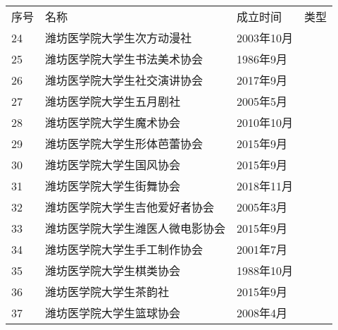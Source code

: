 \newpage
\begin{table}[H]
    \setlength{\leftskip}{0pt plus 1fil minus \marginparwidth}
    \setlength{\rightskip}{\leftskip}
    \vspace*{8em}
    \begin{tabular}{|>{\centering\arraybackslash}p{2em}|>{\centering\arraybackslash}p{21em}|%
        >{\centering\arraybackslash}p{6em}|>{\centering\arraybackslash}p{5em}|}
        \Xhline{1.2pt}
        序号 & 名称               & 成立时间     & 类型                      \\
        \Xhline{1.2pt}
        24 & 潍坊医学院大学生次方动漫社    & 2003年10月 & \multirow{29}{*}{文化体育类} \\
        \cline{1-3}
        25 & 潍坊医学院大学生书法美术协会   & 1986年9月  &                         \\
        \cline{1-3}
        26 & 潍坊医学院大学生社交演讲协会   & 2017年9月  &                         \\
        \cline{1-3}
        27 & 潍坊医学院大学生五月剧社     & 2005年5月  &                         \\
        \cline{1-3}
        28 & 潍坊医学院大学生魔术协会     & 2010年10月 &                         \\
        \cline{1-3}
        29 & 潍坊医学院大学生形体芭蕾协会   & 2015年9月  &                         \\
        \cline{1-3}
        30 & 潍坊医学院大学生国风协会     & 2015年9月  &                         \\
        \cline{1-3}
        31 & 潍坊医学院大学生街舞协会     & 2018年11月 &                         \\
        \cline{1-3}
        32 & 潍坊医学院大学生吉他爱好者协会  & 2005年3月  &                         \\
        \cline{1-3}
        33 & 潍坊医学院大学生潍医人微电影协会 & 2015年9月  &                         \\
        \cline{1-3}
        34 & 潍坊医学院大学生手工制作协会   & 2001年7月  &                         \\
        \cline{1-3}
        35 & 潍坊医学院大学生棋类协会     & 1988年10月 &                         \\
        \cline{1-3}
        36 & 潍坊医学院大学生茶韵社      & 2015年9月  &                         \\
        \cline{1-3}
        37 & 潍坊医学院大学生篮球协会     & 2008年4月  &                         \\

\end{tabular}
\end{table}
